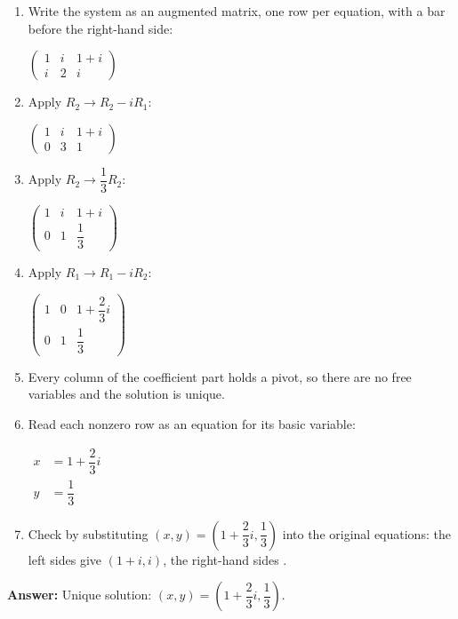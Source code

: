 \documentclass[11pt]{article}
\begin{document}
\begin{tcolorbox}[breakable,colback=ans,colframe=ansb,boxrule=0.5pt,left=4pt,right=4pt,top=2pt,bottom=2pt]\begin{enumerate}[leftmargin=2.2em,itemsep=1pt,topsep=1pt,label=\textbf{Step \arabic*.}]\item Write the system as an augmented matrix, one row per equation, with a bar before the right-hand side:\par\smallskip $\displaystyle \left(\begin{array}{cc|c}1 & i & 1+i \\ i & 2 & i\end{array}\right)$
\item Apply $R_2\to R_2-iR_1$:\par\smallskip $\displaystyle \left(\begin{array}{cc|c}1 & i & 1+i \\ 0 & 3 & 1\end{array}\right)$
\item Apply $R_2\to \dfrac{1}{3} R_2$:\par\smallskip $\displaystyle \left(\begin{array}{cc|c}1 & i & 1+i \\ 0 & 1 & \dfrac{1}{3}\end{array}\right)$
\item Apply $R_1\to R_1-iR_2$:\par\smallskip $\displaystyle \left(\begin{array}{cc|c}1 & 0 & 1+\dfrac{2}{3}i \\ 0 & 1 & \dfrac{1}{3}\end{array}\right)$
\item Every column of the coefficient part holds a pivot, so there are no free variables and the solution is unique.
\item Read each nonzero row as an equation for its basic variable:\par\smallskip $\displaystyle\begin{aligned}x&=1+\dfrac{2}{3}i\\ y&=\dfrac{1}{3}\end{aligned}$
\item Check by substituting $(x,y)=(1+\dfrac{2}{3}i,\dfrac{1}{3})$ into the original equations: the left sides give $(1+i,i)$, the right-hand sides \checkmark.
\end{enumerate}\textbf{Answer:} Unique solution: $(x,y)=(1+\dfrac{2}{3}i,\dfrac{1}{3})$.\end{tcolorbox}
\end{document}
